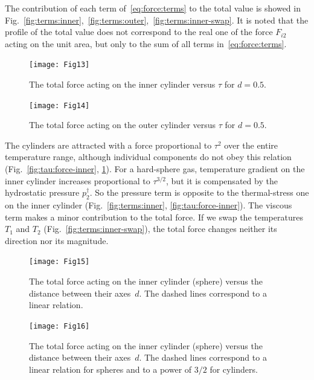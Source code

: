 \documentclass[smallextended, referee]{svjour3} %
\begin{document}
The contribution of each term of~\eqref{eq:force:terms} to the total value is showed
in Fig.~\ref{fig:terms:inner},~\ref{fig:terms:outer},~\ref{fig:terms:inner-swap}.
It is noted that the profile of the total value does not correspond to the real one of the force \(F_{i2}\)
acting on the unit area, but only to the sum of all terms in~\eqref{eq:force:terms}.

\begin{figure}[ht]
    \centering
    \begin{minipage}{.48\textwidth}
        \centering
        \texttt{[image: Fig13]}
        \caption{The total force acting on the inner cylinder versus \(\tau\) for \(d=0.5\).}
        \label{fig:tau:force-inner}
    \end{minipage}
    \quad
    \begin{minipage}{.48\textwidth}
        \centering
        \texttt{[image: Fig14]}
        \caption{The total force acting on the outer cylinder versus \(\tau\) for \(d=0.5\).}
        \label{fig:tau:force-outer}
    \end{minipage}
\end{figure}

The cylinders are attracted with a force proportional to \(\tau^2\) over the entire temperature range,
although individual components do not obey this relation (Fig.~\ref{fig:tau:force-inner}, \ref{fig:tau:force-outer}).
For a hard-sphere gas, temperature gradient on the inner cylinder increases proportional to \(\tau^{3/2}\),
but it is compensated by the hydrostatic pressure \(p^\dag_2\).
So the pressure term is opposite to the thermal-stress one on the inner cylinder
(Fig.~\ref{fig:terms:inner}, \ref{fig:tau:force-inner}).
The viscous term makes a minor contribution to the total force.
If we swap the temperatures \(T_1\) and \(T_2\) (Fig.~\ref{fig:terms:inner-swap}),
the total force changes neither its direction nor its magnitude.

\begin{figure}[ht]
    \centering
    \begin{minipage}{.48\textwidth}
        \centering
        \texttt{[image: Fig15]}
        \caption{The total force acting on the inner cylinder (sphere)
                versus the distance between their axes~\(d\).
                The dashed lines correspond to a linear relation.}
        \label{fig:forces:total}
    \end{minipage}
    \quad
    \begin{minipage}{.48\textwidth}
        \centering
        \texttt{[image: Fig16]}
        \caption{The total force acting on the inner cylinder (sphere)
                versus the distance between their axes~\(d\).
                The dashed lines correspond to a linear relation for spheres
                and to a power of \(3/2\) for cylinders.}
        \label{fig:forces:inverse}
    \end{minipage}
\end{figure}
\end{document}
